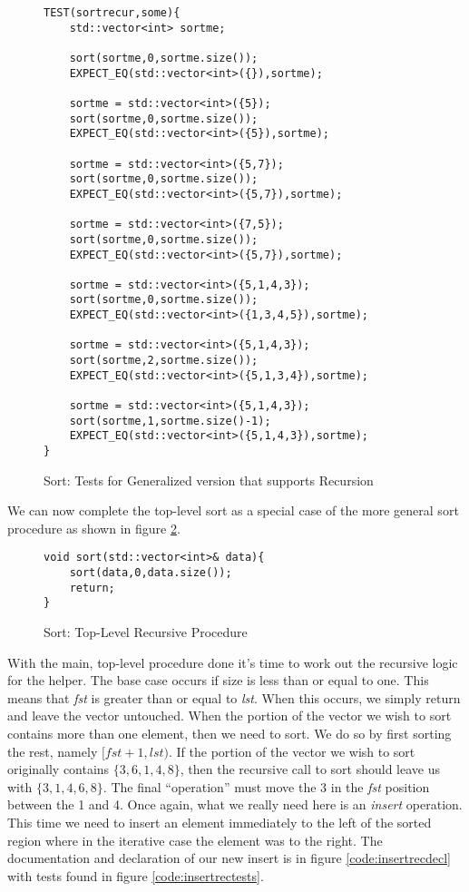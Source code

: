 \documentclass[]{tufte-handout}
\begin{document}
\begin{figure}[!htbp]
\begin{lstlisting}
TEST(sortrecur,some){
    std::vector<int> sortme;

    sort(sortme,0,sortme.size());
    EXPECT_EQ(std::vector<int>({}),sortme);

    sortme = std::vector<int>({5});
    sort(sortme,0,sortme.size());
    EXPECT_EQ(std::vector<int>({5}),sortme);

    sortme = std::vector<int>({5,7});
    sort(sortme,0,sortme.size());
    EXPECT_EQ(std::vector<int>({5,7}),sortme);

    sortme = std::vector<int>({7,5});
    sort(sortme,0,sortme.size());
    EXPECT_EQ(std::vector<int>({5,7}),sortme);

    sortme = std::vector<int>({5,1,4,3});
    sort(sortme,0,sortme.size());
    EXPECT_EQ(std::vector<int>({1,3,4,5}),sortme);

    sortme = std::vector<int>({5,1,4,3});
    sort(sortme,2,sortme.size());
    EXPECT_EQ(std::vector<int>({5,1,3,4}),sortme);

    sortme = std::vector<int>({5,1,4,3});
    sort(sortme,1,sortme.size()-1);
    EXPECT_EQ(std::vector<int>({5,1,4,3}),sortme);
}
\end{lstlisting}
\caption{Sort: Tests for Generalized version that supports Recursion}
\label{code:sortrecworktests}
\end{figure}

We can now complete the top-level sort as a special case of the more general sort procedure as shown in figure \ref{code:sortrectop}.
\begin{figure}[!htbp]
\begin{lstlisting}
void sort(std::vector<int>& data){
    sort(data,0,data.size());
    return;
}
\end{lstlisting}
\caption{Sort: Top-Level Recursive Procedure}
\label{code:sortrectop}
\end{figure}

With the main, top-level procedure done it's time to work out the recursive logic for the helper. The base case occurs if size is less than or equal to one. This means that \textit{fst} is greater than or equal to \textit{lst}. When this occurs, we simply return and leave the vector untouched. When the portion of the vector we wish to sort contains more than one element, then we need to sort. We do so by first sorting the rest, namely $[fst+1,lst)$. If the portion of the vector we wish to sort originally contains $\{3,6,1,4,8\}$, then the recursive call to sort should leave us with $\{3,1,4,6,8\}$.  The final ``operation'' must move the 3 in the \textit{fst} position between the 1 and 4. Once again, what we really need here is an \textit{insert} operation. This time we need to insert an element immediately to the left of the sorted region where in the iterative case the element was to the right.  The documentation and declaration of our new insert is in figure \ref{code:insertrecdecl} with tests found in figure \ref{code:insertrectests}.
\end{document}

